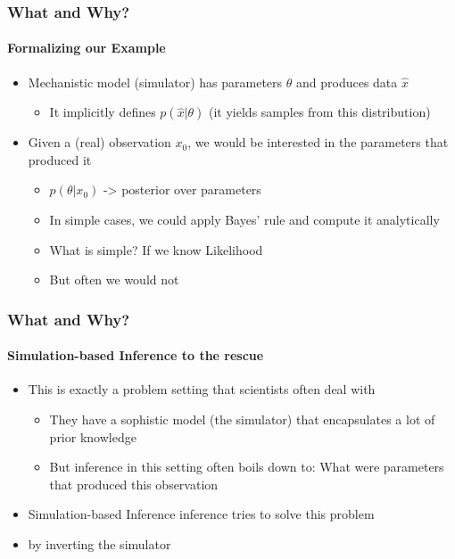 \documentclass[9pt]{beamer}
\begin{document}
\begin{frame}
\frametitle{What and Why?}
\framesubtitle{Formalizing our Example}
\begin{itemize}
	\item Mechanistic model (simulator) has parameters $\theta$ and produces data $\hat{x}$
	\begin{itemize}
		\item It implicitly defines $p(\hat{x}|\theta)$ (it yields samples from this distribution)
	\end{itemize}
	\item Given a (real) observation $x_0$, we would be interested in the parameters that produced it
	\begin{itemize}
		\item $p(\theta|x_0)$ -> posterior over parameters
		\item In simple cases, we could apply Bayes' rule and compute it analytically
		\item What is simple? If we know Likelihood
		\item But often we would not
	\end{itemize}
\end{itemize}
\end{frame} 



\begin{frame}
\frametitle{What and Why?}
\framesubtitle{Simulation-based Inference to the rescue}
\begin{itemize}
		\item This is exactly a problem setting that scientists often deal with
	\begin{itemize}
		\item They have a sophistic model (the simulator) that encapsulates a lot of prior knowledge
		\item But inference in this setting often boils down to: What were parameters that produced this observation
	\end{itemize}
	\item Simulation-based Inference inference tries to solve this problem
	\item by inverting the simulator
\end{itemize}
\end{frame} 
\end{document}
